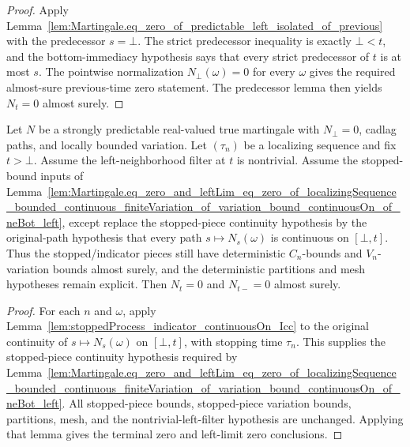 \begin{proof}
Apply
Lemma~\ref{lem:Martingale.eq_zero_of_predictable_left_isolated_of_previous}
with the predecessor \(s=\bot\).  The strict predecessor inequality is exactly
\(\bot<t\), and the bottom-immediacy hypothesis says that every strict
predecessor of \(t\) is at most \(s\).  The pointwise normalization
\(N_\bot(\omega)=0\) for every \(\omega\) gives the required almost-sure
previous-time zero statement.  The predecessor lemma then yields
\(N_t=0\) almost surely.
\end{proof}

\begin{lemma}\label{lem:Martingale.eq_zero_and_leftLim_eq_zero_of_localizingSequence_bounded_continuous_finiteVariation_of_variation_bound_original_continuousOn_of_neBot_left}
Let \(N\) be a strongly predictable real-valued true martingale with
\(N_\bot=0\), cadlag paths, and locally bounded variation.  Let
\((\tau_n)\) be a localizing sequence and fix \(t>\bot\).  Assume the
left-neighborhood filter at \(t\) is nontrivial.  Assume the stopped-bound
inputs of
Lemma~\ref{lem:Martingale.eq_zero_and_leftLim_eq_zero_of_localizingSequence_bounded_continuous_finiteVariation_of_variation_bound_continuousOn_of_neBot_left},
except replace the stopped-piece continuity hypothesis by the original-path
hypothesis that every path \(s\mapsto N_s(\omega)\) is continuous on
\([\bot,t]\).  Thus the stopped/indicator pieces still have deterministic
\(C_n\)-bounds and \(V_n\)-variation bounds almost surely, and the deterministic
partitions and mesh hypotheses remain explicit.  Then \(N_t=0\) and
\(N_{t-}=0\) almost surely.
\end{lemma}

\begin{proof}
For each \(n\) and \(\omega\), apply
Lemma~\ref{lem:stoppedProcess_indicator_continuousOn_Icc} to the original
continuity of \(s\mapsto N_s(\omega)\) on \([\bot,t]\), with stopping time
\(\tau_n\).  This supplies the stopped-piece continuity hypothesis required by
Lemma~\ref{lem:Martingale.eq_zero_and_leftLim_eq_zero_of_localizingSequence_bounded_continuous_finiteVariation_of_variation_bound_continuousOn_of_neBot_left}.
All stopped-piece bounds, stopped-piece variation bounds, partitions, mesh, and
the nontrivial-left-filter hypothesis are unchanged.  Applying that lemma gives
the terminal zero and left-limit zero conclusions.
\end{proof}

